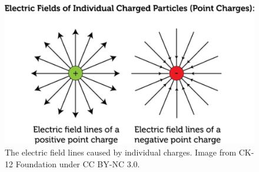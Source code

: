 \begin{figure}
    \centering
    \includegraphics[width=.8\textwidth]{Figures/electric_field_point_charge.png}
    \caption{The electric field lines caused by individual charges.
    Image from CK-12 Foundation under CC BY-NC 3.0.
        \cite{ck12}}
    \label{fig:electric_field_point_charges}
\end{figure}
